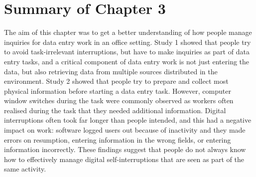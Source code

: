 \section{Summary of Chapter 3}
The aim of this chapter was to get a better understanding of how people manage inquiries for data entry work in an office setting. Study 1 showed that people try to avoid task-irrelevant interruptions, but have to make inquiries as part of data entry tasks, and a critical component of data entry work is not just entering the data, but also retrieving data from multiple sources distributed in the environment. Study 2 showed that people try to prepare and collect most physical information before starting a data entry task. However, computer window switches during the task were commonly observed as workers often realised during the task that they needed additional information. Digital interruptions often took far longer than people intended, and this had a negative impact on work: software logged users out because of inactivity and they made errors on resumption, entering information in the wrong fields, or entering information incorrectly. These findings suggest that people do not always know how to effectively manage digital self-interruptions that are seen as part of the same activity. 

